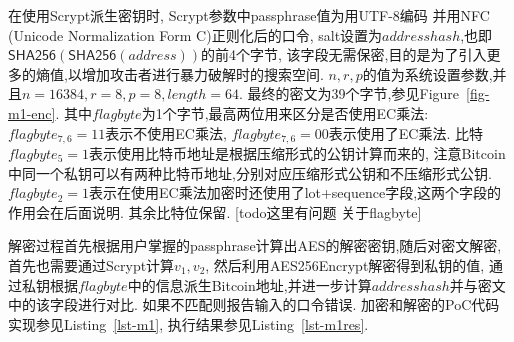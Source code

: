 在使用Scrypt派生密钥时, Scrypt参数中passphrase值为用UTF-8编码
并用NFC (Unicode Normalization Form C)正则化后的口令,
salt设置为$addresshash$,也即$ \textsf{SHA256}(\textsf{SHA256}(address))$的前4个字节, 
该字段无需保密,目的是为了引入更多的熵值,以增加攻击者进行暴力破解时的搜索空间.
$n, r, p$的值为系统设置参数,并且$n=16384, r=8, p=8, length=64$.
最终的密文为39个字节,参见Figure~\ref{fig-m1-enc}.
其中$flagbyte$为1个字节,最高两位用来区分是否使用EC乘法:
$flagbyte_{7,6}=11$表示不使用EC乘法,
$flagbyte_{7,6}=00$表示使用了EC乘法.
比特$flagbyte_{5}=1$表示使用比特币地址是根据压缩形式的公钥计算而来的,
注意Bitcoin中同一个私钥可以有两种比特币地址,分别对应压缩形式公钥和不压缩形式公钥.
$flagbyte_{2}=1$表示在使用EC乘法加密时还使用了lot+sequence字段,这两个字段的作用会在后面说明.
其余比特位保留.
[todo这里有问题 关于flagbyte]



解密过程首先根据用户掌握的passphrase计算出AES的解密密钥,随后对密文解密,
首先也需要通过Scrypt计算$v_1, v_2$, 然后利用\textsf{AES256Encrypt}解密得到私钥的值,
通过私钥根据$flagbyte$中的信息派生Bitcoin地址,并进一步计算$addresshash$并与密文中的该字段进行对比.
如果不匹配则报告输入的口令错误. 加密和解密的PoC代码实现参见Listing~\ref{lst-m1},
执行结果参见Listing~\ref{lst-m1res}.


